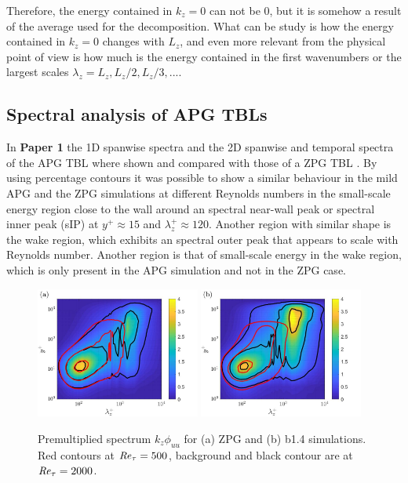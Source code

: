 Therefore, the energy contained in $k_z=0$ can not be 0, but it is somehow a result of the average used for the decomposition.
What can be study is how the energy contained in $k_z=0$ changes with $L_z$, and even more relevant from the physical point of view is how much is the energy contained in the first wavenumbers or the largest scales $\lambda_z=L_z, L_z/2, L_z/3,...$.


\subsection{Spectral analysis of APG TBLs}

In \textbf{Paper 1} the 1D spanwise spectra and the 2D spanwise and temporal spectra of the APG TBL where shown and compared with those of a ZPG TBL \citep{EAmorZPG}. By using percentage contours it was possible to show a similar behaviour in the mild APG and the ZPG simulations at different Reynolds numbers in the small-scale energy region close to the wall around an spectral near-wall peak or spectral inner peak (sIP) at $y^+\approx 15$ and $\lambda_z^+\approx 120$. Another region with similar shape is the wake region, which exhibits an spectral outer peak that appears to scale with Reynolds number.
Another region is that of small-scale energy in the wake region, which is only present in the APG simulation and not in the ZPG case.

\begin{figure}[h!]
\centering
\includegraphics[width=0.48\textwidth]{ZPG_uu.jpg}
\includegraphics[width=0.48\textwidth]{APG_uu.jpg}
\caption{ \label{fig:ZPG_APG_Ret_500_2000_uu} Premultiplied spectrum $k_z\phi_{uu}$ for (a) ZPG and (b) b1.4 simulations. Red contours at $\mbox{\textit{Re}}_{\tau}=500$, background and black contour are at $\mbox{\textit{Re}}_{\tau}=2000$. }
\end{figure}

